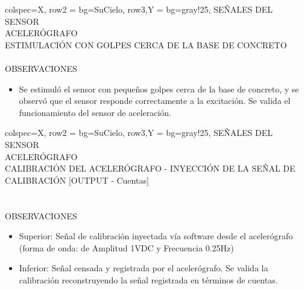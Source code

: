 % 
\newpage
\begin{tblr}{
        colspec={X},
        row{2} = {bg=SuCielo},
        row{3,Y} = {bg=gray!25},
    } %
    SEÑALES DEL SENSOR \\
    ACELERÓGRAFO \MakeUppercase{} \\
    ESTIMULACIÓN CON GOLPES CERCA DE LA BASE DE CONCRETO \\
     \\
    OBSERVACIONES \\
    \begin{itemize}
        \item Se estimuló el sensor con pequeños golpes cerca de la base de concreto, y se observó que el sensor responde correctamente a la excitación. Se valida el funcionamiento del sensor de aceleración.
    \end{itemize}
\end{tblr}
% 
\newpage
\begin{tblr}{
        colspec={X},
        row{2} = {bg=SuCielo},
        row{3,Y} = {bg=gray!25},
    } %
    SEÑALES DEL SENSOR \\
    ACELERÓGRAFO \MakeUppercase{} \\
    CALIBRACIÓN DEL ACELERÓGRAFO - INYECCIÓN DE LA SEÑAL DE CALIBRACIÓN [OUTPUT - Cuentas] \\
     \\
     \\
    OBSERVACIONES \\
    \begin{itemize}
        \item Superior: Señal de calibración inyectada vía software desde el acelerógrafo (forma de onda:  de Amplitud 1VDC y Frecuencia 0.25Hz)
        \item Inferior: Señal censada y registrada por el acelerógrafo. Se valida la calibración reconstruyendo la señal registrada en términos de cuentas.
    \end{itemize}
\end{tblr}
% 
\newpage
